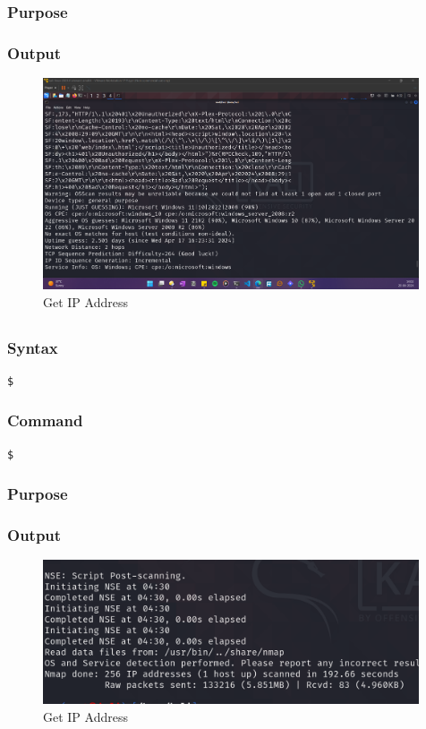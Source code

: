 \documentclass[11pt]{article}
\begin{document}
\subsubsection*{Purpose}

\subsubsection*{Output}
\begin{figure}[H]
    \centering
    \includegraphics[width=0.99\textwidth]{a4 (2).png}
    \caption{Get IP Address}
    \label{fig:1}
\end{figure}
\subsection{}

\subsubsection*{Syntax}
\begin{verbatim}
$
\end{verbatim}

\subsubsection*{Command}
\begin{verbatim}
$
\end{verbatim}

\subsubsection*{Purpose}

\subsubsection*{Output}
\begin{figure}[H]
    \centering
    \includegraphics[width=0.99\textwidth]{a4 (3).png}
    \caption{Get IP Address}
    \label{fig:1}
\end{figure}
\end{document}
